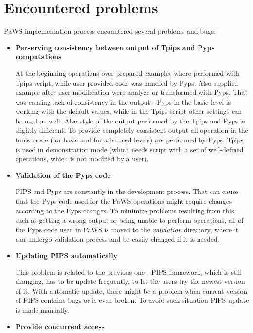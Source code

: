 \section{Encountered problems}
\label{encountered_problems}

PaWS implementation process encountered several problems and bugs:

\begin{itemize}
  \item {\bf Perserving consistency between output of Tpips and Pyps computations}
  
  At the beginning operations over prepared examples where performed with Tpips script, while user provided code was handled by Pyps. Also supplied example after user modification were analyze or transformed with Pyps. That was causing lack of consistency in the output - Pyps in the basic level is working with the default values, while in the Tpips script other settings can be used as well. Also style of the output performed by the Tpips and Pyps is slightly different. To provide completely consistent output all operation in the tools mode (for basic and for advanced levels) are performed by Pyps. Tpips is used in demonstration mode (which needs script with a set of well-defined operations, which is not modified by a user).
  
  \item {\bf Validation of the Pyps code}
  
  PIPS and Pyps are constantly in the development process. That can cause that the Pyps code used for the PaWS operations might require changes according to the Pyps changes. To minimize problems resulting from this, such as getting a wrong output or being unable to perform operations, all of the Pyps code used in PaWS is moved to the \emph{validation} directory, where it can undergo validation process and be easily changed if it is needed.
  
  \item {\bf Updating PIPS automatically}
  
  This problem is related to the previous one - PIPS framework, which is still changing, has to be update frequently, to let the users try the newest version of it. With automatic update, there might be a problem when current version of PIPS contains bugs or is even broken. To avoid such situation PIPS update is made manually.
  
  \item {\bf Provide concurrent access}
  

\end{itemize}
